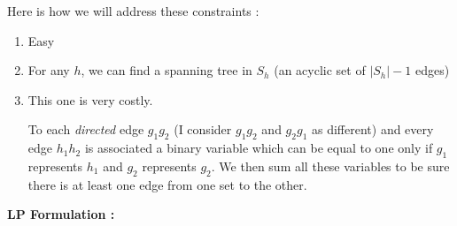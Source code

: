 Here is how we will address these constraints :

\begin{enumerate}
\item Easy
\item For any $h$, we can find a spanning tree in $S_h$ (an acyclic set of $|S_h|-1$ edges)
\item This one is very costly.

To each {\em directed} edge $g_1g_2$ (I consider $g_1g_2$ and $g_2g_1$ as different) and every edge $h_1h_2$ is associated a binary variable which can be equal to one only if $g_1$ represents $h_1$ and $g_2$ represents $g_2$. We then sum all these variables to be sure there is at least one edge from one set to the other.
\end{enumerate}

\newpage
{\bf LP Formulation :}
